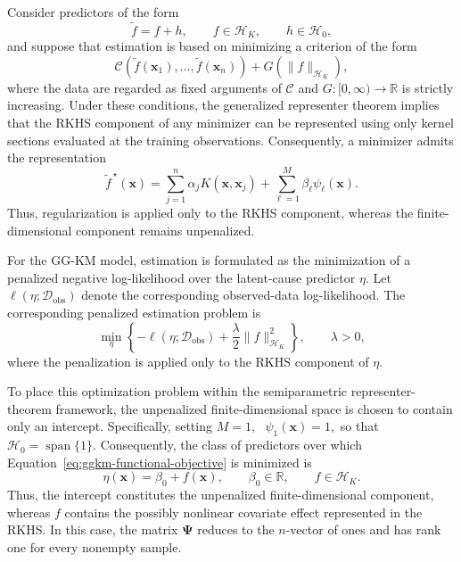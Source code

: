 {	Consider predictors of the form
	\begin{equation*}
	    \widetilde f
	    =
	    f+h,
	    \qquad
	    f\in\mathcal H_K,
	    \qquad
	    h\in\mathcal H_0,
	\end{equation*}
	and suppose that estimation is based on minimizing a criterion of the form
	\begin{equation*}
	    \mathcal C
	    \left(
	        \widetilde f(\bm{x}_1),
	        \ldots,
	        \widetilde f(\bm{x}_n)
	    \right)
	    +
	    G\!\left(\|f\|_{\mathcal H_K}\right),
	\end{equation*}
	where the data are regarded as fixed arguments of $\mathcal C$ and
	$G:[0,\infty)\to\mathbb R$ is strictly increasing. Under these conditions,
	the generalized representer theorem implies that the RKHS component of any
	minimizer can be represented using only kernel sections evaluated at the
	training observations. Consequently, a minimizer admits the representation
	\begin{equation}
	    \widetilde f^{\,\star}(\bm{x})
	    =
	    \sum_{j=1}^{n}
	        \alpha_j K(\bm{x},\bm{x}_j)
	    +
	    \sum_{\ell=1}^{M}
	        \beta_\ell\psi_\ell(\bm{x}).
	    \label{eq:semiparametric-representer}
	\end{equation}
	Thus, regularization is applied only to the RKHS component, whereas the
	finite-dimensional component remains unpenalized.

	For the GG-KM model, estimation is formulated as the minimization of a
	penalized negative log-likelihood over the latent-cause predictor
	$\eta$. Let
	$\ell(\eta;\mathcal D_{\text{obs}})$ denote the corresponding observed-data
	log-likelihood. The corresponding penalized estimation problem is
	\begin{equation}
	    \min_{\eta}
	    \left\{
	        -\ell(\eta;\mathcal D_{\text{obs}})
	        +
	        \frac{\lambda}{2}
	        \|f\|_{\mathcal H_K}^{2}
	    \right\},
	    \qquad
	    \lambda>0,
	    \label{eq:ggkm-functional-objective}
	\end{equation}
	where the penalization is applied only to the RKHS component of
	$\eta$.

	To place this optimization problem within the semiparametric
	representer-theorem framework, the unpenalized finite-dimensional
	space is chosen to contain only an intercept. Specifically, setting
	$
	    M=1,
		\text{ }
	    \psi_1(\bm{x})=1,
	$
	so that
	$
	    \mathcal H_0
	    =
	    \operatorname{span}\{1\}.
	$
	Consequently, the class of predictors over which
	Equation~\eqref{eq:ggkm-functional-objective} is minimized is
	\begin{equation}
	    \eta(\bm{x})
	    =
	    \beta_0+f(\bm{x}),
	    \qquad
	    \beta_0\in\mathbb R,
	    \qquad
	    f\in\mathcal H_K.
	    \label{eq:ggkm-semiparametric-predictor}
	\end{equation}
	Thus, the intercept constitutes the unpenalized finite-dimensional
	component, whereas $f$ contains the possibly nonlinear covariate
	effect represented in the RKHS. In this case, the matrix
	$\bm\Psi$ reduces to the $n$-vector of ones and has rank one for
	every nonempty sample.

}
